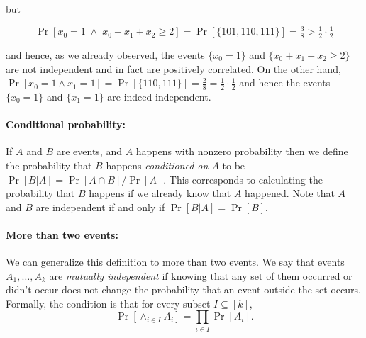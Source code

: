 but

\begin{equation*}
\Pr[x_0 =1 \; \wedge \; x_0+x_1+x_2 \geq 2 ] = \Pr[ \{101,110,111 \} ] = \tfrac{3}{8} > \tfrac{1}{2} \cdot \tfrac{1}{2}
\end{equation*}

and hence, as we already observed, the events \(\{ x_0 = 1 \}\) and
\(\{ x_0+x_1+x_2 \geq 2 \}\) are not independent and in fact are
positively correlated. On the other hand,
\(\Pr[ x_0 = 1 \wedge x_1 = 1 ] = \Pr[ \{110,111 \}] = \tfrac{2}{8} = \tfrac{1}{2} \cdot \tfrac{1}{2}\)
and hence the events \(\{x_0 = 1 \}\) and \(\{ x_1 = 1 \}\) are indeed
independent.

\hypertarget{disjoint}{}

\paragraph{Conditional probability:} If \(A\) and \(B\) are events, and
\(A\) happens with nonzero probability then we define the probability
that \(B\) happens \emph{conditioned on \(A\)} to be
\(\Pr[B|A] = \Pr[A \cap B]/\Pr[A]\). This corresponds to calculating the
probability that \(B\) happens if we already know that \(A\) happened.
Note that \(A\) and \(B\) are independent if and only if
\(\Pr[B|A]=\Pr[B]\).

\paragraph{More than two events:} We can generalize this definition to
more than two events. We say that events \(A_1,\ldots,A_k\) are
\emph{mutually independent} if knowing that any set of them occurred or
didn't occur does not change the probability that an event outside the
set occurs. Formally, the condition is that for every subset
\(I \subseteq [k]\),
\begin{equation*}
\Pr[ \wedge_{i\in I} A_i] =\prod_{i\in I} \Pr[A_i].
\end{equation*}


